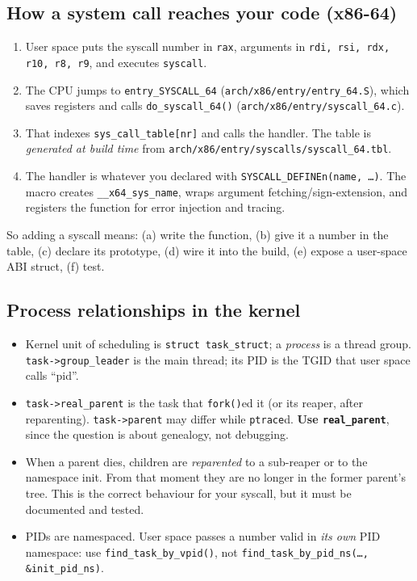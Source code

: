 \documentclass[11pt,a4paper]{article}
\newcommand{\kfile}[1]{\texttt{\small #1}}
\begin{document}
\subsection{How a system call reaches your code (x86-64)}
\begin{enumerate}
  \item User space puts the syscall number in \texttt{rax}, arguments in \texttt{rdi, rsi, rdx, r10, r8, r9}, and executes \texttt{syscall}.
  \item The CPU jumps to \texttt{entry\_SYSCALL\_64} (\kfile{arch/x86/entry/entry\_64.S}), which saves registers and calls \texttt{do\_syscall\_64()} (\kfile{arch/x86/entry/syscall\_64.c}).
  \item That indexes \texttt{sys\_call\_table[nr]} and calls the handler. The table is \emph{generated at build time} from \kfile{arch/x86/entry/syscalls/syscall\_64.tbl}.
  \item The handler is whatever you declared with \texttt{SYSCALL\_DEFINEn(name, \dots)}. The macro creates \texttt{\_\_x64\_sys\_name}, wraps argument fetching/sign-extension, and registers the function for error injection and tracing.
\end{enumerate}
So adding a syscall means: (a) write the function, (b) give it a number in the table, (c) declare its prototype, (d) wire it into the build, (e) expose a user-space ABI struct, (f) test.

\subsection{Process relationships in the kernel}
\begin{itemize}
  \item Kernel unit of scheduling is \texttt{struct task\_struct}; a \emph{process} is a thread group. \texttt{task->group\_leader} is the main thread; its PID is the TGID that user space calls ``pid''.
  \item \texttt{task->real\_parent} is the task that \texttt{fork()}ed it (or its reaper, after reparenting). \texttt{task->parent} may differ while \texttt{ptrace}d. \textbf{Use \texttt{real\_parent}}, since the question is about genealogy, not debugging.
  \item When a parent dies, children are \emph{reparented} to a sub-reaper or to the namespace init. From that moment they are no longer in the former parent's tree. This is the correct behaviour for your syscall, but it must be documented and tested.
  \item PIDs are namespaced. User space passes a number valid in \emph{its own} PID namespace: use \texttt{find\_task\_by\_vpid()}, not \texttt{find\_task\_by\_pid\_ns(\dots, \&init\_pid\_ns)}.
\end{itemize}
\end{document}
